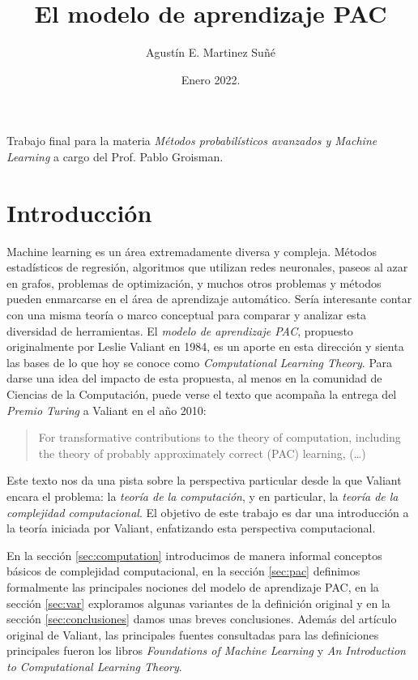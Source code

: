 \documentclass{article}
\title{El modelo de aprendizaje PAC}
\date{Enero 2022.}
\author{Agust\'in E. Martinez Su\~n\'e}
\theoremstyle{definition}
\begin{document}
\maketitle

Trabajo final para la materia \emph{M\'etodos probabil\'isticos avanzados y Machine Learning} a cargo del Prof. Pablo Groisman.
\section{Introducci\'on}

Machine learning es un \'area extremadamente diversa y compleja. M\'etodos estad\'isticos de regresi\'on, algoritmos que utilizan redes neuronales, paseos al azar en grafos, problemas de optimizaci\'on, y muchos otros problemas y m\'etodos pueden enmarcarse en el \'area de aprendizaje autom\'atico. Ser\'ia interesante contar con una misma teor\'ia o marco conceptual para comparar y analizar esta diversidad de herramientas. El \emph{modelo de aprendizaje PAC}, propuesto originalmente por Leslie Valiant en 1984\cite{valiant:ca84}, es un aporte en esta direcci\'on y sienta las bases de lo que hoy se conoce como \emph{Computational Learning Theory}. Para darse una idea del impacto de esta propuesta, al menos en la comunidad de Ciencias de la Computaci\'on, puede verse el texto que acompa\~na la entrega del \emph{Premio Turing} a Valiant en el a\~no 2010:
\begin{quote}
    For transformative contributions to the theory of computation, including the theory of probably approximately correct (PAC) learning, (\dots)
\end{quote}

Este texto nos da una pista sobre la perspectiva particular desde la que Valiant encara el problema: la \emph{teor\'ia de la computaci\'on}, y en particular, la \emph{teor\'ia de la complejidad computacional}. El objetivo de este trabajo es dar una introducci\'on a la teor\'ia iniciada por Valiant, enfatizando esta perspectiva computacional.

En la secci\'on \ref{sec:computation} introducimos de manera informal conceptos b\'asicos de complejidad computacional, en la secci\'on \ref{sec:pac} definimos formalmente las principales nociones del modelo de aprendizaje PAC, en la secci\'on \ref{sec:var} exploramos algunas variantes de la definici\'on original y en la secci\'on \ref{sec:conclusiones} damos unas breves conclusiones.
Adem\'as del art\'iculo original de Valiant, las principales fuentes consultadas para las definiciones principales fueron los libros \emph{Foundations of Machine Learning}\cite{mohri18} y \emph{An Introduction to Computational Learning Theory}\cite{kearns94}.
\end{document}
